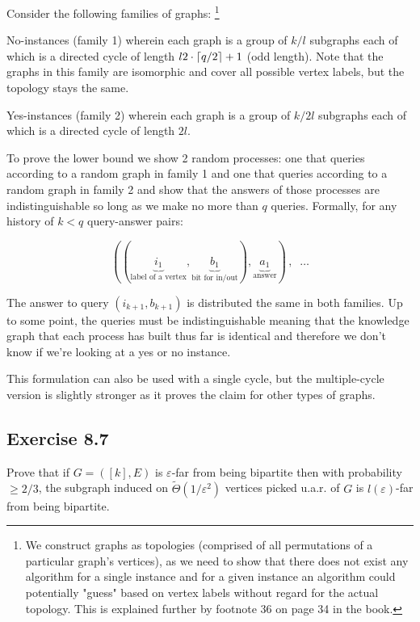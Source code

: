 \documentclass{idc_msc}
\let\defeq\relax
\newcommand\defeq{\stackrel{\mathclap{\normalfont\mbox{def}}}{=}}
\begin{document}
Consider the following families of graphs:
\footnote{We construct graphs as topologies (comprised of all permutations of a particular graph's vertices), as we need to show that there does not exist any algorithm for a single instance and for a given instance an algorithm could potentially "guess" based on vertex labels without regard for the actual topology. This is explained further by footnote 36 on page 34 in the book.}

No-instances (family 1) wherein each graph is a group of \(k/l\) subgraphs each of which is a directed cycle of length \(l \defeq 2 \cdot \lceil q / 2 \rceil +1\) (odd length).
Note that the graphs in this family are isomorphic and cover all possible vertex labels, but the topology stays the same.

Yes-instances (family 2) wherein each graph is a group of \(k/2l\) subgraphs each of which is a directed cycle of length \(2l\).

To prove the lower bound we show 2 random processes: one that queries according to a random graph in family 1 and one that queries according to a random graph in family 2 and show that the answers of those processes are indistinguishable so long as we make no more than \(q\) queries.
Formally, for any history of \(k < q\) query-answer pairs:

\[
  ((\underbrace{i_1}_{\textrm{label of a vertex}}, \underbrace{b_1}_{\textrm{bit for in/out}}), \underbrace{a_1}_{\textrm{answer}})\,,\;\; \ldots
\]

The answer to query \((i_{k+1}, b_{k+1})\) is distributed the same in both families.
Up to some point, the queries must be indistinguishable meaning that the knowledge graph that each process has built thus far is identical and therefore we don't know if we're looking at a yes or no instance.

This formulation can also be used with a single cycle, but the multiple-cycle version is slightly stronger as it proves the claim for other types of graphs.


\subsection{Exercise 8.7}

Prove that if \(G = ([k], E)\) is \(\varepsilon\)-far from being bipartite then with probability \(\ge 2/3\), the subgraph induced on \(\widetilde{\Theta}(1 / \varepsilon^2)\) vertices picked u.a.r. of \(G\) is \(l(\varepsilon)\)-far from being bipartite.
\end{document}
